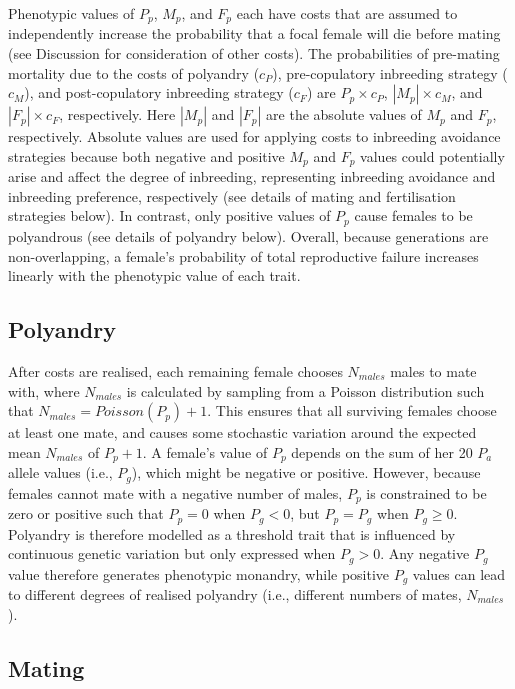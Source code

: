 \documentclass[12pt]{article}
\begin{document}
Phenotypic values of $P_{p}$, $M_{p}$, and $F_{p}$ each have costs that are assumed to independently increase the probability that a focal female will die before mating (see Discussion for consideration of other costs). The probabilities of pre-mating mortality due to the costs of polyandry ($c_{P}$), pre-copulatory inbreeding strategy ($c_{M}$), and post-copulatory inbreeding strategy ($c_{F}$) are $P_{p} \times c_{P}$, $|M_{p}| \times c_{M}$, and $|F_{p}| \times c_{F}$, respectively. Here $|M_{p}|$ and $|F_{p}|$ are the absolute values of $M_{p}$ and $F_{p}$, respectively. Absolute values are used for applying costs to inbreeding avoidance strategies because both negative and positive $M_{p}$ and $F_{p}$ values could potentially arise and affect the degree of inbreeding, representing inbreeding avoidance and inbreeding preference, respectively (see details of mating and fertilisation strategies below). In contrast, only positive values of $P_{p}$ cause females to be polyandrous (see details of polyandry below). Overall, because generations are non-overlapping, a female's probability of total reproductive failure increases linearly with the phenotypic value of each trait.

\subsection*{Polyandry}

After costs are realised, each remaining female chooses $N_{males}$ males to mate with, where $N_{males}$ is calculated by sampling from a Poisson distribution such that $N_{males} = Poisson(P_{p}) + 1$. This ensures that all surviving females choose at least one mate, and causes some stochastic variation around the expected mean $N_{males}$ of $P_{p}+1$. A female's value of $P_{p}$ depends on the sum of her 20 $P_{a}$ allele values (i.e., $P_{g}$), which might be negative or positive. However, because females cannot mate with a negative number of males, $P_{p}$ is constrained to be zero or positive such that $P_{p} = 0$ when $P_{g} < 0$, but $P_{p} = P_{g}$ when $P_{g} \geq 0$. Polyandry is therefore modelled as a threshold trait \cite[][]{Lynch1998, Roff1996, Roff1998, Duthie} that is influenced by continuous genetic variation but only expressed when $P_{g} > 0$. Any negative $P_{g}$ value therefore generates phenotypic monandry, while positive $P_{g}$ values can lead to different degrees of realised polyandry (i.e., different numbers of mates, $N_{males}$).

\subsection*{Mating}
\end{document}

